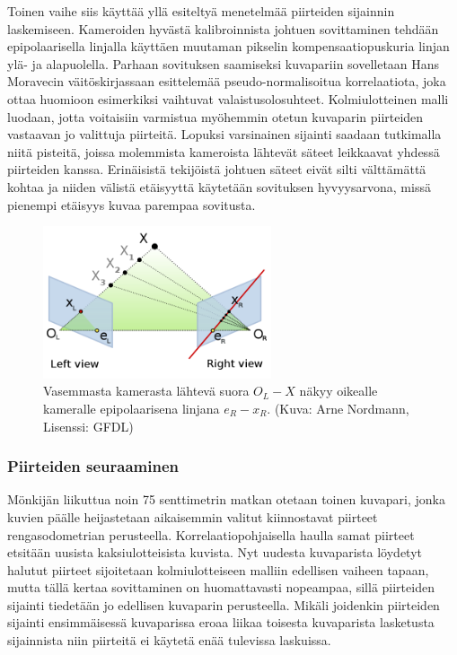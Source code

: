 \documentclass[finnish]{tktltiki2}
\theoremstyle{definition}
\theoremstyle{remark}
\begin{document}
Toinen vaihe siis käyttää yllä esiteltyä menetelmää piirteiden sijainnin laskemiseen. Kameroiden hyvästä kalibroinnista johtuen sovittaminen tehdään epipolaarisella linjalla käyttäen muutaman pikselin kompensaatiopuskuria linjan ylä- ja alapuolella. Parhaan sovituksen saamiseksi kuvapariin sovelletaan Hans Moravecin väitöskirjassaan esittelemää pseudo-normalisoitua korrelaatiota, joka ottaa huomioon esimerkiksi vaihtuvat valaistusolosuhteet\cite{moravec1980obstacle}. Kolmiulotteinen malli luodaan, jotta voitaisiin varmistua myöhemmin otetun kuvaparin piirteiden vastaavan jo valittuja piirteitä. Lopuksi varsinainen sijainti saadaan tutkimalla niitä pisteitä, joissa molemmista kameroista lähtevät säteet leikkaavat yhdessä piirteiden kanssa. Erinäisistä tekijöistä johtuen säteet eivät silti välttämättä kohtaa ja niiden välistä etäisyyttä käytetään sovituksen hyvyysarvona, missä pienempi etäisyys kuvaa parempaa sovitusta.\cite{cheng2005visual}

\begin{figure}[H]
	\caption{Vasemmasta kamerasta lähtevä suora $O_L-X$ näkyy oikealle kameralle epipolaarisena linjana $e_R-x_R$. (Kuva: Arne Nordmann, Lisenssi: GFDL)}
	\centering
		\includegraphics[width=0.6\textwidth]{epipolar_geometry}
\end{figure}

\subsubsection{Piirteiden seuraaminen}
Mönkijän liikuttua noin 75 senttimetrin matkan otetaan toinen kuvapari, jonka kuvien päälle heijastetaan aikaisemmin valitut kiinnostavat piirteet rengasodometrian perusteella. Korrelaatiopohjaisella haulla samat piirteet etsitään uusista kaksiulotteisista kuvista. Nyt uudesta kuvaparista löydetyt halutut piirteet sijoitetaan kolmiulotteiseen malliin edellisen vaiheen tapaan, mutta tällä kertaa sovittaminen on huomattavasti nopeampaa, sillä piirteiden sijainti tiedetään jo edellisen kuvaparin perusteella. Mikäli joidenkin piirteiden sijainti ensimmäisessä kuvaparissa eroaa liikaa toisesta kuvaparista lasketusta sijainnista niin piirteitä ei käytetä enää tulevissa laskuissa.\cite{cheng2005visual}
\end{document}
